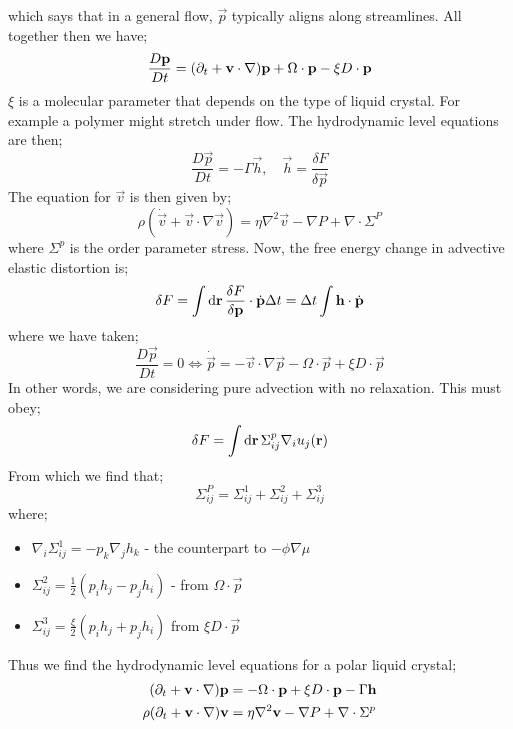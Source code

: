 which says that in a general flow, $\vec{p}$ typically aligns along streamlines. All together then we have;
\begin{equation*}
\frac{D\mathbf{p}}{D t} = (\partial_t + \mathbf{v}\cdot\nabla)\mathbf{p} + \Omega \cdot \mathbf{p} - \xi D\cdot \mathbf{p}
\end{equation*}
$\xi$ is a molecular parameter that depends on the type of liquid crystal. For example a polymer might stretch under flow. The hydrodynamic level equations are then;
\begin{equation}
\frac{D\vec{p}}{Dt} = -\Gamma \vec{h}, \quad \vec{h} = \frac{\delta F}{\delta \vec{p}}
\end{equation}
The equation for $\vec{v}$ is then given by;
\begin{equation}
\rho(\dot{\vec{v}} + \vec{v}\cdot \nabla \vec{v}) = \eta \nabla^2 \vec{v} - \nabla P + \nabla \cdot \Sigma^P
\end{equation}
where $\Sigma^{p}$ is the order parameter stress. Now, the free energy change in advective elastic distortion is;
\begin{equation*}
\delta F = \int{\text{d}\mathbf{r} \,\frac{\delta F}{\delta \mathbf{p}}\cdot \dot{\mathbf{p}}\Delta t} = \Delta t \int{\mathbf{h}\cdot\dot{\mathbf{p}}}
\end{equation*}
where we have taken;
\begin{equation*}
\frac{D\vec{p}}{Dt} = 0 \iff \dot{\vec{p}} = -\vec{v}\cdot \nabla \vec{p} - \Omega \cdot \vec{p} + \xi D\cdot \vec{p}
\end{equation*}
In other words, we are considering pure advection with no relaxation. This must obey;
\begin{equation*}
\delta F = \int{\text{d}\mathbf{r} \,\Sigma_{ij}^{p}\nabla_i u_j(\mathbf{r})}
\end{equation*}
From which we find that;
\begin{equation*}
\Sigma^{P}_{ij} = \Sigma_{ij}^{1} + \Sigma_{ij}^{2} + \Sigma_{ij}^{3}
\end{equation*}
where;
\begin{itemize}
\item $\nabla_i \Sigma_{ij}^{1} = -p_k \nabla_j h_k$ - the counterpart to $-\phi \nabla \mu$ 
\item $\Sigma^{2}_{ij} = \tfrac{1}{2}\left(p_i h_j - p_j h_i\right)$ - from $\Omega \cdot \vec{p}$
\item $\Sigma^{3}_{ij} = \tfrac{\xi}{2}(p_i h_j + p_j h_i)$ from $\xi D\cdot \vec{p}$
\end{itemize}
Thus we find the hydrodynamic level equations for a polar liquid crystal;
\begin{align}
(\partial_t + \mathbf{v}\cdot \nabla)\mathbf{p} &= -\Omega \cdot \mathbf{p} + \xi D\cdot\mathbf{p} - \Gamma \mathbf{h} \\
\rho(\partial_t + \mathbf{v}\cdot \nabla)\mathbf{v} &= \eta \nabla^2 \mathbf{v} - \nabla P + \nabla \cdot \Sigma^{p}
\end{align}
